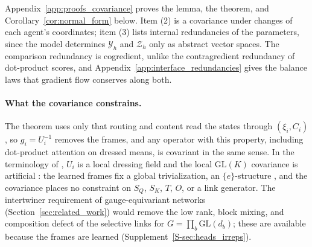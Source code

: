 \documentclass[twoside,11pt]{article}
\begin{document}
Appendix~\ref{app:proofs_covariance} proves the lemma, the theorem, and Corollary~\ref{cor:normal_form} below. Item (2) is a covariance under changes of each agent's coordinates; item (3) lists internal redundancies of the parameters, since the model determines $\mathcal Y_h$ and $\mathcal Z_h$ only as abstract vector spaces. The comparison redundancy is cogredient, unlike the contragredient redundancy of dot-product scores, and Appendix~\ref{app:interface_redundancies} gives the balance laws that gradient flow conserves along both.

\paragraph{What the covariance constrains.}
The theorem uses only that routing and content read the states through $(\xi_i,C_i)$, so $g_i=U_i^{-1}$ removes the frames, and any operator with this property, including dot-product attention on dressed means, is covariant in the same sense. In the terminology of \citet{Fournel2014Dressing}, $U_i$ is a local dressing field and the local $\mathrm{GL}(K)$ covariance is artificial \citep[Sec.~2.2]{Francois2019Artificial}: the learned frames fix a global trivialization, an $\{e\}$-structure \citep[Sec.~2.1.1]{weiler2021coordinate}, and the covariance places no constraint on $S_Q$, $S_K$, $T$, $O$, or a link generator. The intertwiner requirement of gauge-equivariant networks (Section~\ref{sec:related_work}) would remove the low rank, block mixing, and composition defect of the selective links for $G=\prod_b\mathrm{GL}(d_b)$; these are available because the frames are learned (Supplement~\ref{S-sec:heads_irreps}).
\end{document}
